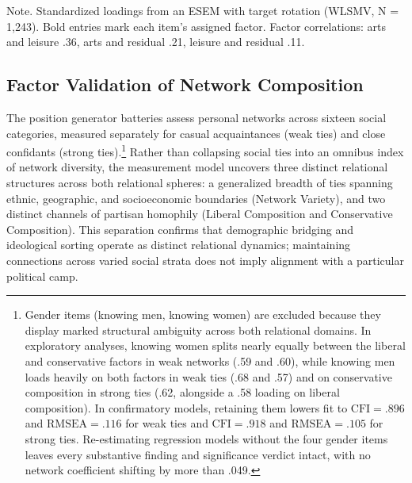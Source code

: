 \documentclass[
  12pt
]{article}
\begin{document}
Note. Standardized loadings from an ESEM with target rotation (WLSMV, N = 1,243). Bold entries mark each item's assigned factor. Factor correlations: arts and leisure .36, arts and residual .21, leisure and residual .11.


\subsection{Factor Validation of Network Composition}\label{factor-validation-of-network-composition}

The position generator batteries assess personal networks across sixteen social categories, measured separately for casual acquaintances (weak ties) and close confidants (strong ties).\footnote{Gender items (knowing men, knowing women) are excluded because they display marked structural ambiguity across both relational domains. In exploratory analyses, knowing women splits nearly equally between the liberal and conservative factors in weak networks (.59 and .60), while knowing men loads heavily on both factors in weak ties (.68 and .57) and on conservative composition in strong ties (.62, alongside a .58 loading on liberal composition). In confirmatory models, retaining them lowers fit to $\text{CFI} = .896$ and $\text{RMSEA} = .116$ for weak ties and $\text{CFI} = .918$ and $\text{RMSEA} = .105$ for strong ties. Re-estimating regression models without the four gender items leaves every substantive finding and significance verdict intact, with no network coefficient shifting by more than .049.} Rather than collapsing social ties into an omnibus index of network diversity, the measurement model uncovers three distinct relational structures across both relational spheres: a generalized breadth of ties spanning ethnic, geographic, and socioeconomic boundaries (Network Variety), and two distinct channels of partisan homophily (Liberal Composition and Conservative Composition). This separation confirms that demographic bridging and ideological sorting operate as distinct relational dynamics; maintaining connections across varied social strata does not imply alignment with a particular political camp.
\end{document}
